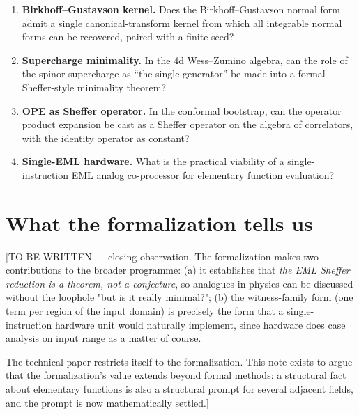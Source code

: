 \documentclass[11pt,a4paper]{article}
\begin{document}
\begin{enumerate}[topsep=2pt, itemsep=4pt]
  \item \textbf{Birkhoff--Gustavson kernel.} Does the
    Birkhoff--Gustavson normal form admit a single canonical-transform
    kernel from which all integrable normal forms can be recovered,
    paired with a finite seed?

  \item \textbf{Supercharge minimality.} In the 4d
    Wess--Zumino algebra, can the role of the spinor supercharge as
    ``the single generator'' be made into a formal Sheffer-style
    minimality theorem?

  \item \textbf{OPE as Sheffer operator.} In the conformal bootstrap,
    can the operator product expansion be cast as a Sheffer
    operator on the algebra of correlators, with the identity
    operator as constant?

  \item \textbf{Single-EML hardware.} What is the practical viability
    of a single-instruction EML analog co-processor for elementary
    function evaluation?
\end{enumerate}

\section{What the formalization tells us}
\label{sec:what-formalization-says}

[TO BE WRITTEN — closing observation. The formalization makes two
contributions to the broader programme: (a) it establishes that
\emph{the EML Sheffer reduction is a theorem, not a conjecture}, so
analogues in physics can be discussed without the loophole "but is
it really minimal?"; (b) the witness-family form (one term per
region of the input domain) is precisely the form that a
single-instruction hardware unit would naturally implement, since
hardware does case analysis on input range as a matter of course.

The technical paper restricts itself to the formalization. This note
exists to argue that the formalization's value extends beyond
formal methods: a structural fact about elementary functions is
also a structural prompt for several adjacent fields, and the prompt
is now mathematically settled.]

\medskip
\end{document}
